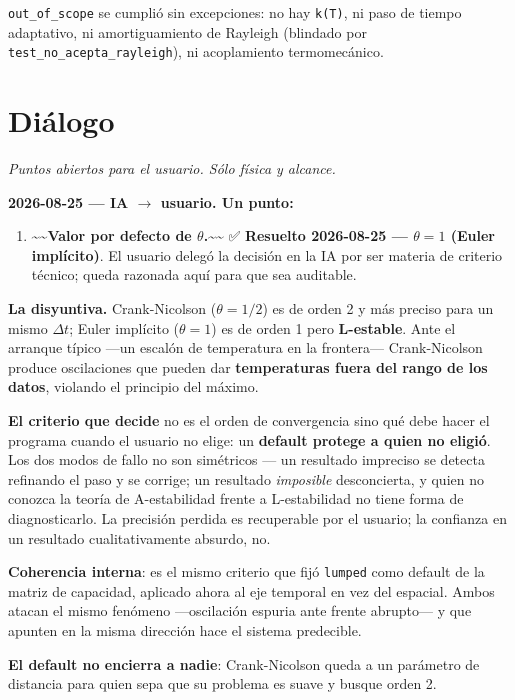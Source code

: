 \documentclass[11pt,letterpaper,oneside]{report}
\begin{document}
\texttt{out\_of\_scope} se cumplió sin excepciones: no hay \texttt{k(T)}, ni paso de tiempo adaptativo, ni amortiguamiento de Rayleigh (blindado por \texttt{test\_no\_acepta\_rayleigh}), ni acoplamiento termomecánico.


\section{Diálogo}

\textit{Puntos abiertos para el usuario. Sólo física y alcance.}

\textbf{2026-08-25 --- IA \ensuremath{\to} usuario. Un punto:}

\begin{enumerate}
  \item \textasciitilde{}\textasciitilde{}\textbf{Valor por defecto de $\theta$.}\textasciitilde{}\textasciitilde{} ✅ \textbf{Resuelto 2026-08-25 --- $\theta = 1$ (Euler implícito)}. El usuario delegó la decisión en la IA por ser materia de criterio técnico; queda razonada aquí para que sea auditable.
\end{enumerate}

   \textbf{La disyuntiva.} Crank-Nicolson ($\theta = 1/2$) es de orden 2 y más preciso para un mismo $\Delta t$; Euler implícito ($\theta = 1$) es de orden 1 pero \textbf{L-estable}. Ante el arranque típico ---un escalón de temperatura en la frontera--- Crank-Nicolson produce oscilaciones que pueden dar \textbf{temperaturas fuera del rango de los datos}, violando el principio del máximo.

   \textbf{El criterio que decide} no es el orden de convergencia sino qué debe hacer el programa cuando el usuario no elige: un \textbf{default protege a quien no eligió}. Los dos modos de fallo no son simétricos --- un resultado impreciso se detecta refinando el paso y se corrige; un resultado \textit{imposible} desconcierta, y quien no conozca la teoría de A-estabilidad frente a L-estabilidad no tiene forma de diagnosticarlo. La precisión perdida es recuperable por el usuario; la confianza en un resultado cualitativamente absurdo, no.

   \textbf{Coherencia interna}: es el mismo criterio que fijó \texttt{lumped} como default de la matriz de capacidad, aplicado ahora al eje temporal en vez del espacial. Ambos atacan el mismo fenómeno ---oscilación espuria ante frente abrupto--- y que apunten en la misma dirección hace el sistema predecible.

   \textbf{El default no encierra a nadie}: Crank-Nicolson queda a un parámetro de distancia para quien sepa que su problema es suave y busque orden 2.
\end{document}
